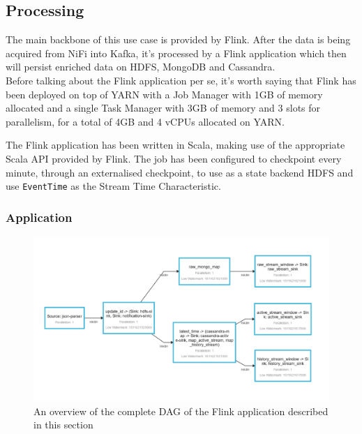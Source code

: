 \subsection{Processing}

The main backbone of this use case is provided by Flink. After the data is being acquired from NiFi into Kafka, it's processed by a Flink application which then will persist enriched data on HDFS, MongoDB and Cassandra.
\\
Before talking about the Flink application per se, it's worth saying that Flink has been deployed on top of YARN with a Job Manager with 1GB of memory allocated and a single Task Manager with 3GB of memory and 3 slots for parallelism, for a total of 4GB and 4 vCPUs allocated on YARN. 

The Flink application has been written in Scala, making use of the appropriate Scala API provided by Flink. The job has been configured to checkpoint every minute, through an externalised checkpoint, to use as a state backend HDFS and use \texttt{EventTime} as the Stream Time Characteristic.

\subsubsection{Application}

\begin{figure}[h]
    \centering
    \includegraphics[width=0.8\linewidth]{Figures/flink_job}
    \caption{An overview of the complete DAG of the Flink application described in this section}
    \label{fig:flinkjob}
\end{figure}


